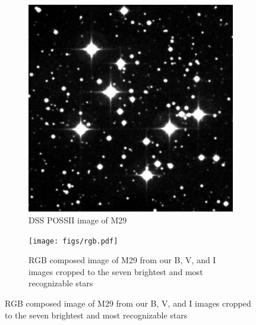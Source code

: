 \documentclass[%
aip,
jmp,
reprint,
floatfix,
nofootinbib
]{revtex4-1}
\begin{document}
	\begin{figure}[H]
		\centering
		\begin{subfigure}[t]{.4\textwidth}
			\centering
			\includegraphics[width=\linewidth]{figs/dss.pdf}
			\caption{DSS POSSII image of M29}
			\label{fig:dss}
		\end{subfigure}
		\qquad
		\begin{subfigure}[t]{.4\textwidth}
			\centering
			\texttt{[image: figs/rgb.pdf]}
			\caption{RGB composed image of M29 from our B, V, and I images cropped to the seven brightest and most recognizable stars}
			\label{fig:rgb}
		\end{subfigure}
	\end{figure}
	
\end{document}
